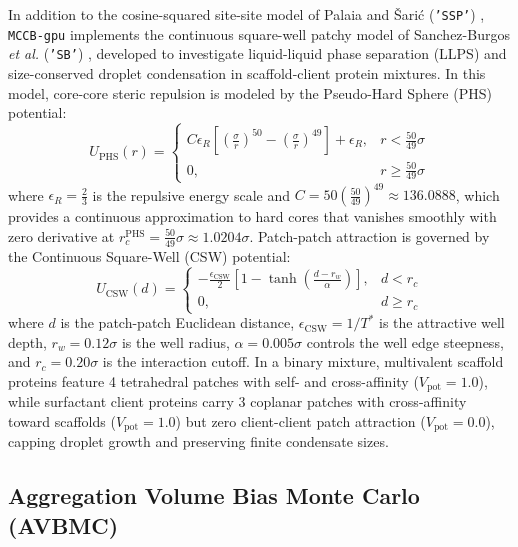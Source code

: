 \documentclass[final,5p,times,twocolumn]{elsarticle}
\begin{document}
In addition to the cosine-squared site-site model of Palaia and \v{S}ari\'{c} (\texttt{'SSP'}) \cite{palaia2022patchy}, \texttt{MCCB-gpu} implements the continuous square-well patchy model of Sanchez-Burgos \textit{et al.} (\texttt{'SB'}) \cite{sanchezburgos2021size}, developed to investigate liquid-liquid phase separation (LLPS) and size-conserved droplet condensation in scaffold-client protein mixtures. In this model, core-core steric repulsion is modeled by the Pseudo-Hard Sphere (PHS) potential:
\begin{equation}
    U_{\text{PHS}}(r) = \begin{cases}
        C \epsilon_R \left[ \left(\frac{\sigma}{r}\right)^{50} - \left(\frac{\sigma}{r}\right)^{49} \right] + \epsilon_R, & r < \frac{50}{49}\sigma \\
        0, & r \ge \frac{50}{49}\sigma
    \end{cases}
    \label{eq:u_phs}
\end{equation}
where $\epsilon_R = \frac{2}{3}$ is the repulsive energy scale and $C = 50 \left(\frac{50}{49}\right)^{49} \approx 136.0888$, which provides a continuous approximation to hard cores that vanishes smoothly with zero derivative at $r_c^{\text{PHS}} = \frac{50}{49}\sigma \approx 1.0204\sigma$. Patch-patch attraction is governed by the Continuous Square-Well (CSW) potential:
\begin{equation}
    U_{\text{CSW}}(d) = \begin{cases}
        -\frac{\epsilon_{\text{CSW}}}{2} \left[ 1 - \tanh\left(\frac{d - r_w}{\alpha}\right) \right], & d < r_c \\
        0, & d \ge r_c
    \end{cases}
    \label{eq:u_csw}
\end{equation}
where $d$ is the patch-patch Euclidean distance, $\epsilon_{\text{CSW}} = 1/T^*$ is the attractive well depth, $r_w = 0.12\sigma$ is the well radius, $\alpha = 0.005\sigma$ controls the well edge steepness, and $r_c = 0.20\sigma$ is the interaction cutoff. In a binary mixture, multivalent scaffold proteins feature 4 tetrahedral patches with self- and cross-affinity ($V_{\text{pot}} = 1.0$), while surfactant client proteins carry 3 coplanar patches with cross-affinity toward scaffolds ($V_{\text{pot}} = 1.0$) but zero client-client patch attraction ($V_{\text{pot}} = 0.0$), capping droplet growth and preserving finite condensate sizes.

\subsection{ Aggregation Volume Bias Monte Carlo (AVBMC)}
\label{sec:algo_avbmc}
\end{document}
